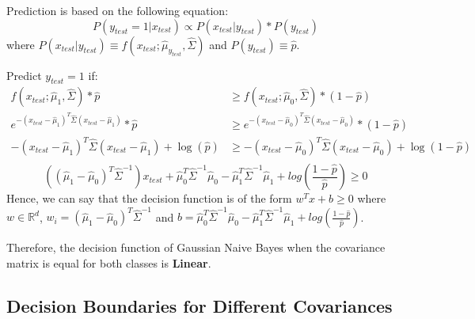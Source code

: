 \documentclass[
]{article}
\begin{document}
Prediction is based on the following equation: \[
P(y_{test}=1|x_{test})\propto P(x_{test}|y_{test})*P(y_{test})
\] where
\(P(x_{test}|y_{test})\equiv f(x_{test};\hat{\mu}_{y_{test}}, \hat{\Sigma})\)
and \(P(y_{test})\equiv \hat{p}\).

Predict \(y_{test}=1\) if: \begin{align*}
f(x_{test};\hat{\mu}_1, \hat{\Sigma})*\hat{p}&\ge f(x_{test};\hat{\mu}_0, \hat{\Sigma})*(1-\hat{p}) \\
e^{-(x_{test}-\hat{\mu}_1)^T\hat{\Sigma}(x_{test}-\hat{\mu}_1)}*\hat{p}&\ge e^{-(x_{test}-\hat{\mu}_0)^T\hat{\Sigma}(x_{test}-\hat{\mu}_0)}*(1-\hat{p}) \\
-(x_{test}-\hat{\mu}_1)^T\hat{\Sigma}(x_{test}-\hat{\mu}_1)+\log(\hat{p})&\ge -(x_{test}-\hat{\mu}_0)^T\hat{\Sigma}(x_{test}-\hat{\mu}_0) + \log(1-\hat{p}) \\
\end{align*} \[
\left( (\hat{\mu}_1-\hat{\mu}_0)^T\hat{\Sigma}^{-1} \right)x_{test} + \hat{\mu}_0^T\hat{\Sigma}^{-1}\hat{\mu}_0 - \hat{\mu}_1^T\hat{\Sigma}^{-1}\hat{\mu}_1 + log(\frac{1-\hat{p}}{\hat{p}}) \ge 0
\] Hence, we can say that the decision function is of the form
\(w^Tx+b\ge0\) where \(w\in\mathbb{R}^d\),
\(w_i= (\hat{\mu}_1-\hat{\mu}_0)^T\hat{\Sigma}^{-1}\) and
\(b=\hat{\mu}_0^T\hat{\Sigma}^{-1}\hat{\mu}_0 - \hat{\mu}_1^T\hat{\Sigma}^{-1}\hat{\mu}_1 + log(\frac{1-\hat{p}}{\hat{p}})\).

Therefore, the decision function of Gaussian Naive Bayes when the
covariance matrix is equal for both classes is \textbf{Linear}.

\hypertarget{decision-boundaries-for-different-covariances}{%
\subsection{Decision Boundaries for Different
Covariances}\label{decision-boundaries-for-different-covariances}}
\end{document}

